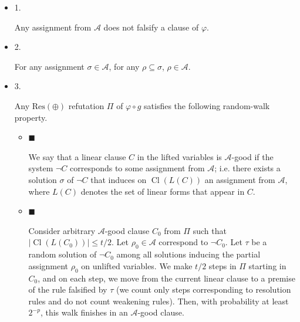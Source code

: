 \begin{itemize}


\item 
1. 


Any assignment from $\mathcal{A}$ does not falsify a clause of $\varphi$.\par





\item 
2. 


For any assignment $\sigma\in\mathcal{A}$, for any $\rho\subseteq\sigma$, $\rho\in\mathcal{A}$.\par





\item 
3. 


Any $\mathrm{Res}(\oplus)$ refutation $\Pi$ of $\varphi\circ g$ satisfies the following random-walk property.\par


\begin{itemize}


\item 
$\blacksquare$ 


We say that a linear clause $C$ in the lifted variables is $\mathcal{A}$-good if the system $\lnot C$ corresponds to some assignment from $\mathcal{A}$; i.e. there exists a solution $\sigma$ of $\lnot C$ that induces on $\mathop{\mathrm{Cl}}(L(C))$ an assignment from $\mathcal{A}$, where $L(C)$ denotes the set of linear forms that appear in $C$.\par





\item 
$\blacksquare$ 


Consider arbitrary $\mathcal{A}$-good clause $C_{0}$ from $\Pi$ such that $|\mathop{\mathrm{Cl}}(L(C_{0}))|\leq t/2$. Let $\rho_{0}\in\mathcal{A}$ correspond to $\lnot C_{0}$. Let $\tau$ be a random solution of $\lnot C_{0}$ among all solutions inducing the partial assignment $\rho_{0}$ on unlifted variables. We make $t/2$ steps in $\Pi$ starting in $C_{0}$, and on each step, we move from the current linear clause to a premise of the rule falsified by $\tau$ (we count only steps corresponding to resolution rules and do not count weakening rules). Then, with probability at least $2^{-p}$, this walk finishes in an $\mathcal{A}$-good clause.\par





\end{itemize}





\end{itemize}


